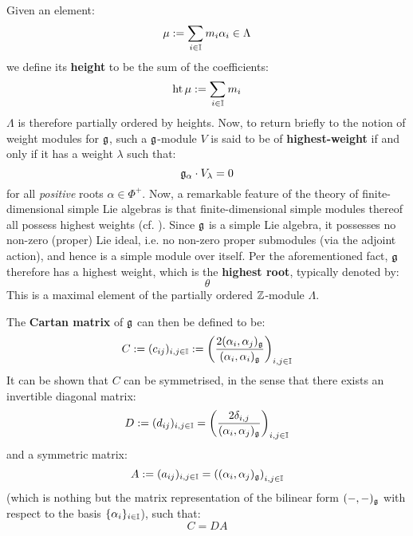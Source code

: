         Given an element:
            $$\mu := \sum_{i \in \mathbb{I}} m_i \alpha_i \in \Lambda$$
        we define its \textbf{height} to be the sum of the coefficients:
            $$\operatorname{ht} \mu := \sum_{i \in \mathbb{I}} m_i$$
        $\Lambda$ is therefore partially ordered by heights. Now, to return briefly to the notion of weight modules for $\mathfrak{g}$, such a $\mathfrak{g}$-module $V$ is said to be of \textbf{highest-weight} if and only if it has a weight $\lambda$ such that:
            $$\mathfrak{g}_{\alpha} \cdot V_{\lambda} = 0$$
        for all \textit{positive} roots $\alpha \in \Phi^+$. Now, a remarkable feature of the theory of finite-dimensional simple Lie algebras is that finite-dimensional simple modules thereof all possess highest weights (cf. \cite[Theorem 21.1, p. 112]{humphreys_lie_algebras}). Since $\mathfrak{g}$ is a simple Lie algebra, it possesses no non-zero (proper) Lie ideal, i.e. no non-zero proper submodules (via the adjoint action), and hence is a simple module over itself. Per the aforementioned fact, $\mathfrak{g}$ therefore has a highest weight, which is the \textbf{highest root}, typically denoted by:
            $$\theta$$
        This is a maximal element of the partially ordered $\mathbb{Z}$-module $\Lambda$.
        
        The \textbf{Cartan matrix} of $\mathfrak{g}$ can then be defined to be:
            $$C := (c_{ij})_{i, j \in \mathbb{I}} := \left( \frac{2(\alpha_i, \alpha_j)_{\mathfrak{g}}}{(\alpha_i, \alpha_i)_{\mathfrak{g}}} \right)_{i, j \in \mathbb{I}}$$
        It can be shown that $C$ can be symmetrised, in the sense that there exists an invertible diagonal matrix:
            $$D := (d_{ij})_{i, j \in \mathbb{I}} = \left(\frac{2\delta_{i, j}}{(\alpha_i, \alpha_j)_{\mathfrak{g}}}\right)_{i, j \in \mathbb{I}}$$
        and a symmetric matrix:
            $$A := (a_{ij})_{i, j \in \mathbb{I}} = \left((\alpha_i, \alpha_j)_{\mathfrak{g}}\right)_{i, j \in \mathbb{I}}$$
        (which is nothing but the matrix representation of the bilinear form $(-, -)_{\mathfrak{g}}$ with respect to the basis $\{\alpha_i\}_{i \in \mathbb{I}}$), such that:
            $$C = DA$$

